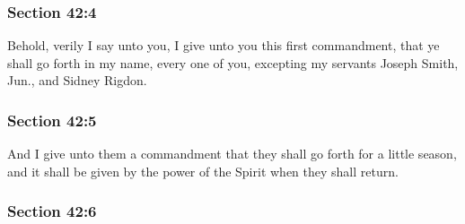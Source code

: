 
	\subsubsection{Section 42:4} %
		\label{DC42-4}

		Behold, verily I say unto you, I give unto you this first commandment, that ye shall go forth in my name, every one of you, excepting my servants Joseph Smith, Jun., and Sidney Rigdon.


	\subsubsection{Section 42:5} %
		\label{DC42-5}

		And I give unto them a commandment that they shall go forth for a little season, and it shall be given by the power of the Spirit when they shall return.


	\subsubsection{Section 42:6} %
		\label{DC42-6}

